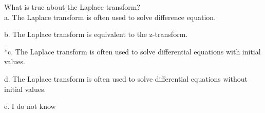 
What is true about the Laplace transform? \\

a. The Laplace transform is often used to solve difference equation.

b. The Laplace transform is equivalent to the z-transform.

*c. The Laplace transform is often used to solve differential equations
with initial values.

d. The Laplace transform is often used to solve differential equations
without initial values.

e. I do not know \\
